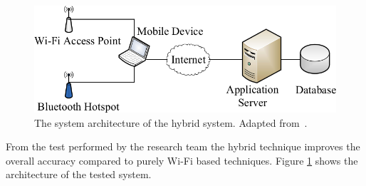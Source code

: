 \begin{figure}%
    \includegraphics[width=\columnwidth]{images/hybridsystemarchitecture.png}%
\caption{The system architecture of the hybrid system. Adapted from~\cite{6068444}.}%
\label{fig:hybridsystemarchitecture}%
\end{figure}
From the test performed by the research team the hybrid technique improves the overall accuracy compared to purely Wi-Fi based techniques. 
Figure \ref{fig:hybridsystemarchitecture} shows the architecture of the tested system.
  
